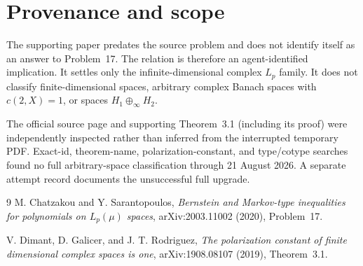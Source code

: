 \documentclass[11pt]{article}
\begin{document}
\section*{Provenance and scope}
The supporting paper predates the source problem and does not identify itself
as an answer to Problem~17.  The relation is therefore an agent-identified
implication.  It settles only the infinite-dimensional complex $L_p$ family.
It does not classify finite-dimensional spaces, arbitrary complex Banach
spaces with $c(2,X)=1$, or spaces $H_1\oplus_\infty H_2$.

The official source page and supporting Theorem~3.1 (including its proof)
were independently inspected rather than inferred from the interrupted
temporary PDF.  Exact-id, theorem-name, polarization-constant, and
type/cotype searches found no full arbitrary-space classification through
21 August 2026.  A separate attempt record documents the unsuccessful full
upgrade.

\begin{thebibliography}{9}
M. Chatzakou and Y. Sarantopoulos,
\emph{Bernstein and Markov-type inequalities for polynomials on
$L_p(\mu)$ spaces}, arXiv:2003.11002 (2020), Problem~17.

V. Dimant, D. Galicer, and J. T. Rodriguez,
\emph{The polarization constant of finite dimensional complex spaces is
one}, arXiv:1908.08107 (2019), Theorem~3.1.
\end{thebibliography}
\end{document}
